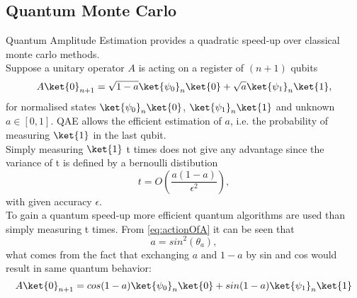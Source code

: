 \documentclass[../../main.tex]{subfiles}
\begin{document}
\subsection{Quantum Monte Carlo}\label{sec: qmc}
Quantum Amplitude Estimation provides a quadratic speed-up over classical monte carlo methods. \\
Suppose a unitary operator $A$ is acting on a register of $(n+1)$ qubits
\begin{equation}\label{eq:action_of_A}
  A\ket{0}_{n+1} = \sqrt{1-a}\ket{\psi_0}_{n}\ket{0}+\sqrt{a}\ket{\psi_1}_{n}\ket{1},
\end{equation}
for normalised states $\ket{\psi_0}_{n}\ket{0}$, $\ket{\psi_1}_{n}\ket{1}$ and unknown $a \in [0,1]$.
QAE allows the efficient estimation of $a$, i.e. the probability of measuring $\ket{1}$ in the last qubit.\\
Simply measuring $\ket{1}$ t times does not give any advantage since the variance of t is defined by a bernoulli distibution
\begin{equation}\label{eq:t}
  t = O(\frac{a(1-a)}{\epsilon^2}),
\end{equation}
with given accuracy $\epsilon$.\\
To gain a quantum speed-up more efficient quantum algorithms are used than simply measuring t times. 
From \ref{eq:actionOfA} it can be seen that
\begin{equation}\label{eq:aIsSin}
  a = sin^2(\theta_a),
\end{equation}
what comes from the fact that exchanging $a \text{ and } 1-a$ by sin and cos would result in same quantum behavior:\\
\begin{equation}\label{eq:action_of_A_sin}
  A\ket{0}_{n+1} = cos(1-a)\ket{\psi_0}_{n}\ket{0}+sin(1-a)\ket{\psi_1}_{n}\ket{1}
\end{equation}
\end{document}
